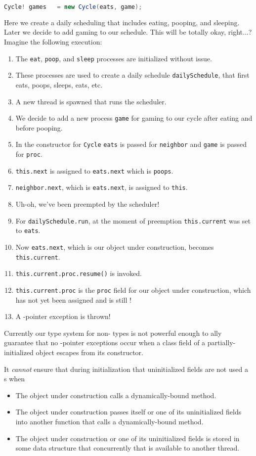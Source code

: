 \documentclass{article}
\begin{document}
\begin{example}
\begin{lstlisting}[escapechar=|, language=Java]
Cycle! games   = new Cycle(eats, game);
\end{lstlisting}
  Here we create a daily scheduling that includes eating, pooping, and sleeping.
  Later we decide to add gaming to our schedule.
  This will be totally okay, right...?
  Imagine the following execution:
  \begin{enumerate}
  \item The \texttt{eat}, \texttt{poop}, and \texttt{sleep} processes are initialized without issue.
  \item These processes are used to create a daily schedule \texttt{dailySchedule}, that first eats, poops, sleeps, eats, etc.
  \item A new thread is spawned that runs the scheduler.
  \item We decide to add a new process \texttt{game} for gaming to our cycle after eating and before pooping.
  \item In the constructor for \texttt{Cycle} \texttt{eats} is passed for \texttt{neighbor} and \texttt{game} is passed for \texttt{proc}.
  \item \texttt{this.next} is assigned to \texttt{eats.next} which is \texttt{poops}.
  \item \texttt{neighbor.next}, which is \texttt{eats.next}, is assigned to \texttt{this}.
  \item Uh-oh, we've been preempted by the scheduler!
  \item For \texttt{dailySchedule.run}, at the moment of preemption \texttt{this.current} was set to \texttt{eats}.
  \item Now \texttt{eats.next}, which is our object under construction, becomes \texttt{this.current}.
  \item \texttt{this.current.proc.resume()} is invoked.
  \item \texttt{this.current.proc} is the \texttt{proc} field for our object under construction, which has not yet been assigned and is still \cringe{}!
  \item A \cringe{}-pointer exception is thrown!
  \end{enumerate}
\end{example}

Currently our type system for non-\cringe{} types is not powerful enough to \static{}ally guarantee that no \cringe{}-pointer exceptions occur when a class field of a partially-initialized object escapes from its constructor.

It \textit{cannot} ensure that during initialization that uninitialized fields are not used a \receiver{}s when
\begin{itemize}
\item The object under construction calls a dynamically-bound method.
\item The object under construction passes itself or one of its uninitialized fields into another function that calls a dynamically-bound method.
\item The object under construction or one of its uninitialized fields is stored in some data structure that concurrently that is available to another thread.
\end{itemize}
\end{document}
